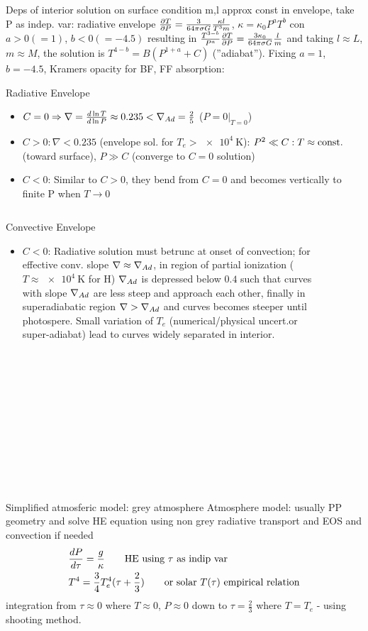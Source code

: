 \begin{frame}{Deps of interior solution on surface condition}
    m,l approx const in envelope, take P as indep. var: radiative envelope $\PDy{P}{T}=\frac{3}{64\pi\sigma G}\frac{\kappa l}{T^3m}$, $\kappa=\kappa_0P^aT^b$ con $a>0(=1)$, $b<0(=-4.5)$ resulting in $\frac{T^{3-b}}{P^a}\PDy{P}{T}=\frac{3\kappa_0}{64\pi\sigma G}\frac{l}{m}$ and taking $l\approx L$, $m\approx M$, the solution is $T^{4-b}=B(P^{1+a}+C)$ (''adiabat''). Fixing $a=1$, $b=-4.5$, Kramers opacity for BF, FF absorption:

Radiative Envelope
\begin{itemize}
	\item $C=0\Rightarrow \nabla=\TDly{P}{T}\approx0.235<\nad=\frac{2}{5}$ ($P=0|_{T=0}$)
	\item $C>0: \nabla<0.235$ (envelope sol. for $T_e>\SI{e4}{\kelvin}$):  $P^2\ll C: T\approx\const{}$ (toward surface), $P\gg C$ (converge to $C=0$ solution)
    \item $C<0$: Similar to $C>0$, they bend from $C=0$ and becomes vertically to finite P when $T\to0$
\end{itemize}
\begin{columns}[T]
\begin{column}{0.45\textwidth}
Convective Envelope
    \begin{itemize} 
        \item $C<0$: Radiative solution must betrunc at onset of convection; for effective conv. slope $\nabla\approx\nad{}$, in region of partial ionization ($T\approx\SI{e4}{\kelvin}$ for H) $\nad{}$ is depressed below $0.4$ such that curves with slope $\nad{}$ are less steep and approach each other, finally in superadiabatic region $\nabla>\nad{}$ and curves becomes steeper until photospere. Small variation of $T_e$ (numerical/physical uncert.or super-adiabat) lead to curves widely separated in interior.
\end{itemize}
\end{column}
\begin{column}{0.5\textwidth}
\begin{figure}[!ht] 
	\texttt{[image: envelopelnTlnP]}\label{fig:envelopelnTlnP}
\end{figure}
\end{column}
\end{columns}
\end{frame}

\begin{frame}{Simplified atmosferic model: grey atmosphere}
Atmosphere model: usually PP geometry and solve HE equation using non grey radiative transport and EOS and convection if needed
\begin{align*}
&\TDy{\tau}{P}=\frac{g}{\kappa}\tag*{HE using $\tau$ as indip var}\\
&T^4=\frac{3}{4}T_e^4(\tau+\frac{2}{3})\tag*{or solar $T(\tau)$ empirical relation}
\end{align*}
integration from $\tau\approx0$ where $T\approx0$, $P\approx0$ down to $\tau=\frac{2}{3}$ where $T=T_e$ - using shooting method.
\end{frame}


